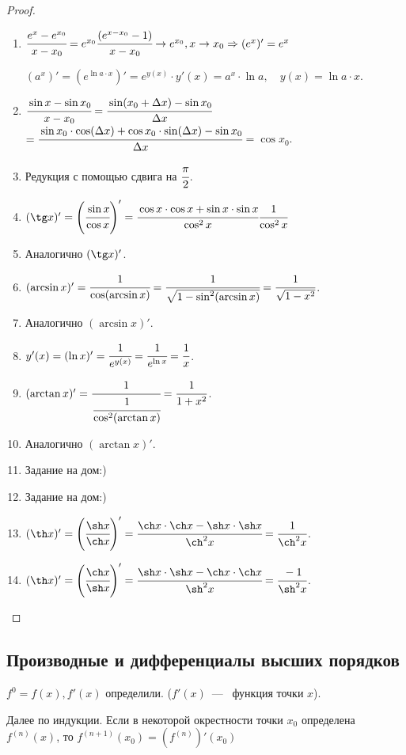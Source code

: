 \begin{proof} $\ $
	\begin{enumerate}
		\item  $\cfrac{e^{x} - e^{x_{0}}}{x-x_{0}} = e^{x_{0}}\cfrac{(e^{x-x_{0}}-1)}{x-x_{0}} \to e^{x_{0}}, x\to x_{0}\Rightarrow (e^{x})' = e^{x}$
		
		$(a^{x})' = (e^{\ln a \cdot x})' = e^{y(x)} \cdot y'(x) = a^{x} \cdot \ln a, \quad y(x) = \ln a\cdot x$.
		
		\item $\cfrac{\sin x- \sin x_{0}}{x - x_{0}} = \cfrac{\sin (x_{0} +\Delta x) - \sin x_{0}}{\Delta x} $ \small$=\cfrac{\sin x_{0} \cdot \cos (\Delta x) + \cos x_{0} \cdot \sin (\Delta x) -\sin x_{0}}{\Delta x} $\normalsize$ = \cos x_{0} $.
		
		\item
		Редукция с помощью сдвига на $\cfrac{\pi}{2}$.
		\item
		$(\tg x)' = \left( \cfrac{\sin x}{\cos x} \right)'= \cfrac{\cos x\cdot \cos x + \sin x \cdot \sin x}{\cos^{2} x}  \cfrac{1}{\cos^{2} x}$
		\item
		Аналогично $(\tg x)'$.
		\item
		$(\arcsin x)' = \cfrac{1}{\cos(\arcsin x)} = \cfrac{1}{\sqrt{1-\sin^{2}(\arcsin x)}} = \cfrac{1}{\sqrt{1 - x^{2}}}$.
		\item
		Аналогично $(\arcsin x)'$.
		\item
		$y'(x) = (\ln x)' = \cfrac{1}{e^{y(x)}} = \cfrac{1}{e^{\ln x}} = \cfrac{1}{x}$.
		\item
		$(\arctan x)' = \cfrac{1}{\cfrac{1}{\cos^{2}(\arctan x)}} = \cfrac{1}{1+x^{2}}$.
		\item
		Аналогично $(\arctan x)'$.
		\item
		Задание на дом:)
		\item
		Задание на дом:)
		\item
		$(\th x)' =\left(\cfrac{\sh x}{\ch x}\right)' = \cfrac{\ch x \cdot \ch x - \sh x \cdot \sh x}{\ch^{2} x} = \cfrac{1}{\ch^{2} x} $.
		\item
		$(\th x)' =\left(\cfrac{\ch x}{\sh x}\right)' = \cfrac{\sh x \cdot \sh x - \ch x \cdot \ch x}{\sh^{2} x} = \cfrac{-1}{\sh^{2} x} $.
	\end{enumerate}
\end{proof}

\subsection{Производные и дифференциалы высших порядков}
\begin{definition}
	$f^{0} = f(x), f'(x)$ определили. ($f'(x)$~---~ функция точки $x$).
	
	Далее по индукции. Если в некоторой окрестности точки $x_{0}$ определена $f^{(n)}(x)$, то $f^{(n+1)} (x_{0}) = \left(f^{(n)}\right)'(x_{0})$
\end{definition}

